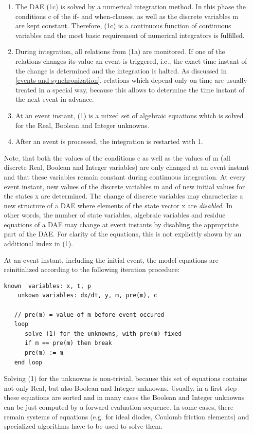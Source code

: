 \documentclass[10pt,a4paper]{report}
\renewcommand{\labelenumi}{\arabic{enumi}.}
\begin{document}
\begin{enumerate}
\def\labelenumi{\arabic{enumi}.}
\item
  The DAE (1c) is solved by a numerical integration method. In this
  phase the conditions c of the if- and when-clauses, as well as the
  discrete variables m are kept constant. Therefore, (1c) is a
  continuous function of continuous variables and the most basic
  requirement of numerical integrators is fulfilled.
\item
  During integration, all relations from (1a) are monitored. If one of
  the relations changes its value an event is triggered, i.e., the exact
  time instant of the change is determined and the integration is
  halted. As discussed in \ref{events-and-synchronization}, relations which depend only on
  time are usually treated in a special way, because this allows to
  determine the time instant of the next event in advance.
\item
  At an event instant, (1) is a mixed set of algebraic equations which
  is solved for the Real, Boolean and Integer unknowns.
\item
  After an event is processed, the integration is restarted with 1.
\end{enumerate}

Note, that both the values of the conditions c as well as the values of
m (all discrete Real, Boolean and Integer variables) are only changed at
an event instant and that these variables remain constant during
continuous integration. At every event instant, new values of the
discrete variables m and of new initial values for the states x are
determined. The change of discrete variables may characterize a new
structure of a DAE where elements of the state vector x are
\emph{disabled}. In other words, the number of state variables,
algebraic variables and residue equations of a DAE may change at event
instants by disabling the appropriate part of the DAE. For clarity of
the equations, this is not explicitly shown by an additional index in
(1).

At an event instant, including the initial event, the model equations
are reinitialized according to the following iteration procedure:

\begin{lstlisting}[language=modelica]
    known  variables: x, t, p
    unkown variables: dx/dt, y, m, pre(m), c 

   // pre(m) = value of m before event occured
   loop
      solve (1) for the unknowns, with pre(m) fixed
      if m == pre(m) then break
      pre(m) := m    
   end loop 
\end{lstlisting}
Solving (1) for the unknowns is non-trivial, because this set of 
equations contains not only Real, but also Boolean and Integer unknowns.
Usually, in a first step these equations are sorted and in many cases
the Boolean and Integer unknowns can be just computed by a forward
evaluation sequence. In some cases, there remain systems of equations
(e.g. for ideal diodes, Coulomb friction elements) and specialized
algorithms have to be used to solve them.
\end{document}
